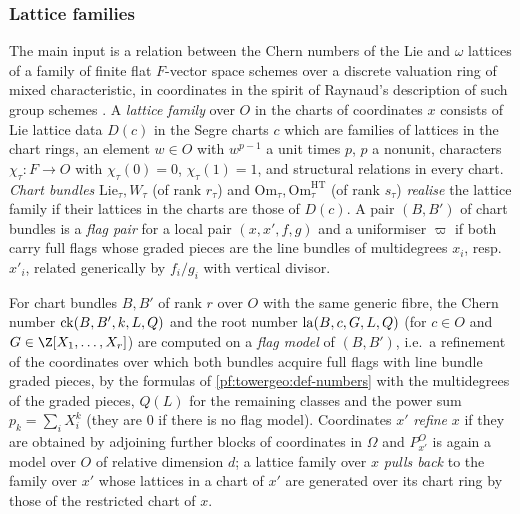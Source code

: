 \subsubsection*{Lattice families}
The main input is a relation between the Chern numbers of the Lie and $\omega$ lattices of a family of
finite flat $F$-vector space schemes over a discrete valuation ring of mixed characteristic, in coordinates
in the spirit of Raynaud's description of such group schemes \cite{Raynaud1974}. A \emph{lattice family}
over $O$ in the charts of coordinates $x$ consists of Lie lattice data $D(c)$ in the Segre charts $c$ which
are families of lattices in the chart rings, an element $w\in O$ with $w^{p-1}$ a unit times $p$, $p$ a
nonunit, characters $\chi_\tau\colon F\to O$ with $\chi_\tau(0)=0$, $\chi_\tau(1)=1$, and structural
relations in every chart. \emph{Chart bundles} $\mathrm{Lie}_\tau,W_\tau$ (of rank $r_\tau$) and
$\mathrm{Om}_\tau,\mathrm{Om}^{\mathrm{HT}}_\tau$ (of rank $s_\tau$) \emph{realise} the lattice family if their
lattices in the charts are those of $D(c)$. A pair $(B,B')$ of chart bundles is a \emph{flag pair} for a
local pair $(x,x',f,g)$ and a uniformiser $\varpi$ if both carry full flags whose graded pieces are the line
bundles of multidegrees $x_i$, resp.\ $x'_i$, related generically by $f_i/g_i$ with vertical divisor.

For chart bundles $B,B'$ of rank $r$ over $O$ with the same generic fibre, the Chern number
$\operatorname{ck}(B,B',k,L,Q)$ and the root number $\operatorname{la}(B,c,G,L,Q)$ (for $c\in O$ and $G\in\Z[X_1,\dots,X_r]$)
are computed on a \emph{flag model} of $(B,B')$, i.e.\ a refinement of the coordinates over which both bundles
acquire full flags with line bundle graded pieces, by the formulas of \cref{pf:towergeo:def-numbers} with the
multidegrees of the graded pieces, $Q(L)$ for the remaining classes and the power sum $p_k=\sum_iX_i^k$ (they
are $0$ if there is no flag model). Coordinates $x'$ \emph{refine} $x$ if they are obtained by adjoining further
blocks of coordinates in $\Omega$ and $P^O_{x'}$ is again a model over $O$ of relative dimension $d$; a lattice
family over $x$ \emph{pulls back} to the family over $x'$ whose lattices in a chart of $x'$ are generated over
its chart ring by those of the restricted chart of $x$.

